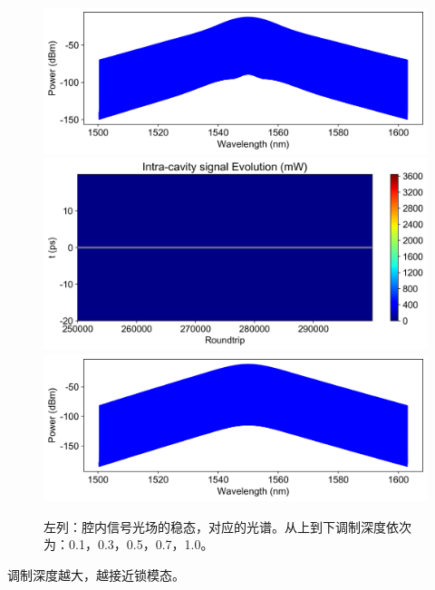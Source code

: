 \begin{figure}[htbp]
    \includegraphics[width=0.48\linewidth]{figure/fig_15_0.png}
    \includegraphics[width=0.48\linewidth]{figure/fig_16.png}
    \includegraphics[width=0.48\linewidth]{figure/fig_16_0.png}
    \caption{左列：腔内信号光场的稳态，对应的光谱。从上到下调制深度依次为：0.1，0.3，0.5，0.7，1.0。}
    \label{fig:enter-label}
\end{figure}
调制深度越大，越接近锁模态。
